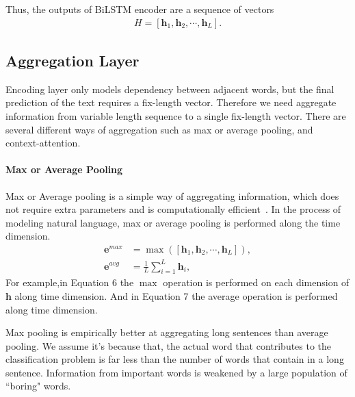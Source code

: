 \documentclass[11pt]{article}
\def\e{\mathbf{e}}
\def\bh{\mathbf{h}}
\def\bh{\mathbf{h}}
\begin{document}
Thus, the outputs of BiLSTM encoder are a sequence of vectors
\begin{align}
	H=[\bh_1,\bh_2,\cdots,\bh_L].
\label{eq:hidden}
\end{align}

\subsection{Aggregation Layer}


Encoding layer only models dependency between adjacent words, but the final prediction of the text requires a fix-length vector. Therefore we need aggregate information from variable length sequence to a single fix-length vector. There are several different ways of aggregation such as max or average pooling, and context-attention.


\paragraph{Max or Average Pooling}
Max or Average pooling is a simple way of aggregating information, which does not require extra parameters and is computationally efficient~\cite{kim2014convolutional,zhao2015self,lin2017structured}.
In the process of modeling natural language, max or average pooling is performed along the time dimension.
\begin{align}	
\e^{max}&=\max([\bh_1,\bh_2,\cdots,\bh_L]),\\
\e^{avg}&=\frac{1}{L} \sum_{i=1}^L {\mathbf{h}_i},
\end{align}
For example,in Equation 6 the $\max$ operation is performed on each dimension of $\mathbf{h}$ along time dimension. And in Equation 7 the average operation is  performed along time dimension.

Max pooling is empirically better at aggregating long sentences than average pooling. We assume it's because that, the actual word that contributes to the classification problem is far less than the number of words that contain in a long sentence. Information from important words is weakened by a large population of ``boring" words. 
\end{document}
